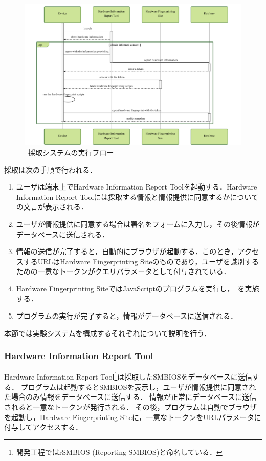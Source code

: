 \begin{figure}[H]
	\centering
    \includegraphics[width=\textwidth,pagebox=artbox]{fig/hero.pdf}
    \caption{\hfp~採取システムの実行フロー}
    \label{fig-hfp_system}
\end{figure}

採取は次の手順で行われる．

\begin{enumerate}
\item ユーザは端末上でHardware Information Report Toolを起動する．Hardware Information Report Toolには採取する情報と情報提供に同意するかについての文言が表示される．
\item ユーザが情報提供に同意する場合は署名をフォームに入力し，その後情報がデータベースに送信される．
\item 情報の送信が完了すると，自動的にブラウザが起動する．このとき，アクセスするURLはHardware Fingerprinting Siteのものであり，ユーザを識別するための一意なトークンがクエリパラメータとして付与されている．
\item Hardware Fingerprinting SiteではJavaScriptのプログラムを実行し，\hfp~を実施する．
\item プログラムの実行が完了すると，情報がデータベースに送信される．
\end{enumerate}
本節では実験システムを構成するそれぞれについて説明を行う．

\subsubsection{Hardware Information Report Tool}
Hardware Information Report Tool\footnote{開発工程ではrSMBIOS (Reporting SMBIOS)と命名している．}は採取したSMBIOSをデータベースに送信する．
プログラムは起動するとSMBIOSを表示し，ユーザが情報提供に同意された場合のみ情報をデータベースに送信する．
情報が正常にデータベースに送信されると一意なトークンが発行される．
その後，プログラムは自動でブラウザを起動し，Hardware Fingerprinting Siteに，一意なトークンをURLパラメータに付与してアクセスする．

